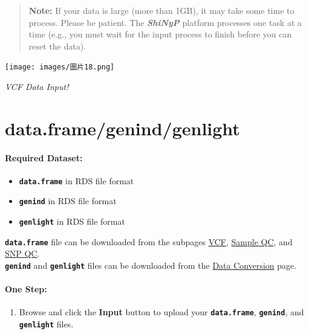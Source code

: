 \documentclass[
]{book}
\providecommand{\tightlist}{%
  \setlength{\itemsep}{0pt}\setlength{\parskip}{0pt}}
\begin{document}
\begin{quote}
\textbf{Note:} If your data is large (more than 1GB), it may take some time to process. Please be patient. The {\textbf{\emph{ShiNyP}}} platform processes one task at a time (e.g., you must wait for the input process to finish before you can reset the data).
\end{quote}

\texttt{[image: images/圖片18.png]}

\emph{VCF Data Input!}

\section{data.frame/genind/genlight}\label{data.framegenindgenlight}

\paragraph*{Required Dataset:}\label{required-dataset}

\begin{itemize}
\item
  {\textbf{\texttt{data.frame}}} in RDS file format
\item
  {\textbf{\texttt{genind}}} in RDS file format
\item
  {\textbf{\texttt{genlight}}} in RDS file format
\end{itemize}

{\textbf{\texttt{data.frame}}} file can be downloaded from the subpages \ul{VCF}, \ul{Sample QC}, and \ul{SNP QC}.\\
{\textbf{\texttt{genind}}} and {\textbf{\texttt{genlight}}} files can be downloaded from the \ul{Data Conversion} page.

\paragraph*{\texorpdfstring{\textbf{One Step:}}{One Step:}}\label{one-step}

\begin{enumerate}
\def\labelenumi{\arabic{enumi}.}
\tightlist
\item
  {Browse} and click the {\textbf{Input}} button to upload your {\textbf{\texttt{data.frame}}}, {\textbf{\texttt{genind}}}, and {\textbf{\texttt{genlight}}} files.
\end{enumerate}
\end{document}
